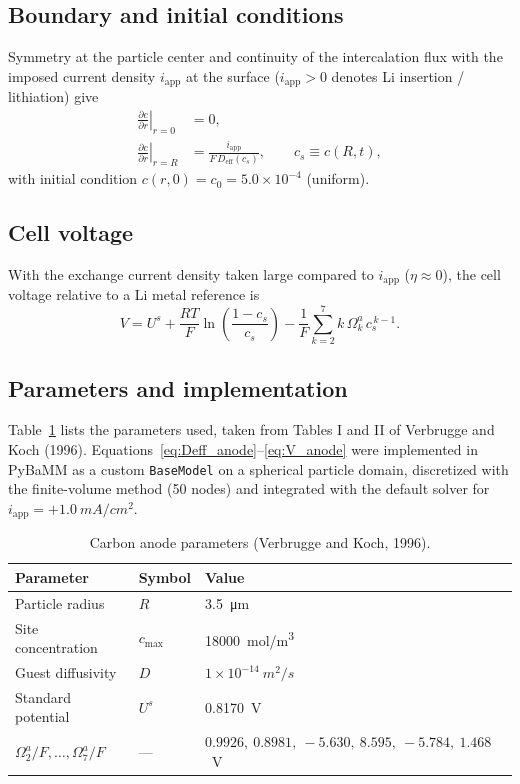 \documentclass[11pt]{article}
\begin{document}
\subsection{Boundary and initial conditions}
Symmetry at the particle center and continuity of the intercalation flux with the imposed current density
$i_{\mathrm{app}}$ at the surface ($i_{\mathrm{app}}>0$ denotes Li insertion / lithiation) give
\begin{align}
\left.\frac{\partial c}{\partial r}\right|_{r=0} &= 0, \\
\left.\frac{\partial c}{\partial r}\right|_{r=R} &= \frac{i_{\mathrm{app}}}{F\,D_{\mathrm{eff}}(c_s)}, \qquad c_s \equiv c(R,t),
\label{eq:bc_anode}
\end{align}
with initial condition $c(r,0) = c_0 = 5.0\times10^{-4}$ (uniform).

\subsection{Cell voltage}
With the exchange current density taken large compared to $i_{\mathrm{app}}$ ($\eta \approx 0$), the cell voltage
relative to a Li metal reference is
\begin{equation}
V = U^{s} + \frac{RT}{F}\ln\!\left(\frac{1-c_s}{c_s}\right) - \frac{1}{F}\sum_{k=2}^{7} k\,\Omega_k^{a}\,c_s^{\,k-1}.
\label{eq:V_anode}
\end{equation}

\subsection{Parameters and implementation}
Table~\ref{tab:anode_params} lists the parameters used, taken from Tables I and II of Verbrugge and Koch (1996).
Equations~\eqref{eq:Deff_anode}--\eqref{eq:V_anode} were implemented in PyBaMM as a custom \texttt{BaseModel} on a
spherical particle domain, discretized with the finite-volume method (50 nodes) and integrated with the default
solver for $i_{\mathrm{app}} = +1.0~\si{mA/cm^2}$.

\begin{table}[h]
\centering
\caption{Carbon anode parameters (Verbrugge and Koch, 1996).}
\label{tab:anode_params}
\begin{tabular}{lll}
\toprule
Parameter & Symbol & Value \\
\midrule
Particle radius & $R$ & \SI{3.5}{\micro\metre} \\
Site concentration & $c_{\max}$ & \SI{18000}{mol/m^3} \\
Guest diffusivity & $D$ & $1\times10^{-14}~\si{m^2/s}$ \\
Standard potential & $U^{s}$ & \SI{0.8170}{V} \\
$\Omega_2^{a}/F,\ldots,\Omega_7^{a}/F$ & --- & $0.9926,\ 0.8981,\ -5.630,\ 8.595,\ -5.784,\ 1.468$~V \\
\bottomrule
\end{tabular}
\end{table}
\end{document}
